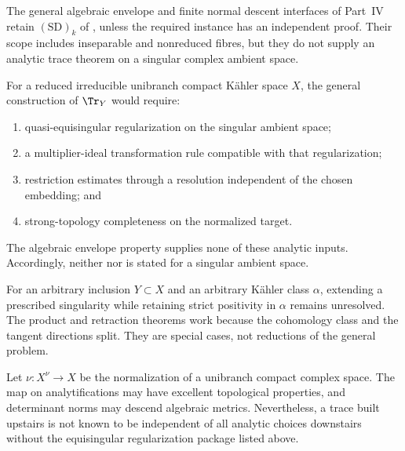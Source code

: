 The general algebraic envelope and finite normal descent interfaces of
Part~IV retain $\mathrm{(SD)}_k$ of , unless
the required instance has an independent proof. Their scope includes
inseparable and nonreduced fibres, but they do not supply an analytic trace theorem
on a singular complex ambient space.

\begin{remark}
\label{rem:functor-unibranch-open}
For a reduced irreducible unibranch compact K\"ahler space $X$, the
general construction of $\Tr_Y$ would require:
\begin{enumerate}
\item quasi-equisingular regularization on the singular ambient space;
\item a multiplier-ideal transformation rule compatible with that
      regularization;
\item restriction estimates through a resolution independent of the
      chosen embedding; and
\item strong-topology completeness on the normalized target.
\end{enumerate}
The algebraic envelope property supplies none of these analytic inputs.
Accordingly, neither  nor
 is stated for a singular
ambient space.
\end{remark}

\begin{remark}
\label{rem:functor-general-dirichlet-open}
For an arbitrary inclusion $Y\subset X$ and an arbitrary K\"ahler
class $\alpha$, extending a prescribed singularity while retaining
strict positivity in $\alpha$ remains unresolved. The product and
retraction theorems work because the cohomology class and the tangent
directions split. They are special cases, not reductions of the
general problem.
\end{remark}

\begin{remark}
\label{ex:functor-finite-does-not-repair}
Let $\nu:X^\nu\to X$ be the normalization of a unibranch compact
complex space. The map on analytifications may have excellent
topological properties, and determinant norms may descend algebraic
metrics. Nevertheless, a trace built upstairs is not known to be
independent of all analytic choices downstairs without the
equisingular regularization package listed above.
\end{remark}

